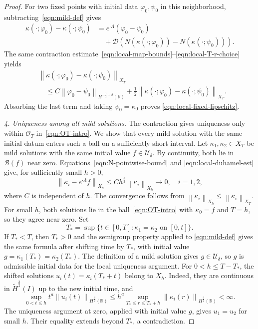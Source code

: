 \documentclass[11pt,reqno]{amsart}
\theoremstyle{plain}
\theoremstyle{definition}
\numberwithin{equation}{section}
\newcommand{\paren}[1]{\left(#1\right)}
\newcommand{\mc}[1]{\mathcal{#1}}
\newcommand{\wt}[1]{\widetilde{#1}}
\newcommand{\norm}[1]{\left\lVert #1 \right\rVert}
\newcommand{\vph}{\varphi}
\newcommand{\R}{\mathbb{R}}
\newcommand{\thi}[1]{\wt H^{#1}(I)}
\newcommand{\hr}[1]{H^{#1}(\R)}
\begin{document}
\begin{proof}
For two fixed points with initial data $\vph_0,\psi_0$ in this neighborhood,
subtracting~\eqref{eqn:mild-def} gives
\begin{equation*}
\begin{aligned}
    \kappa(\cdot;\vph_0)-\kappa(\cdot;\psi_0)
    &=e^{\cdot\Lambda}(\vph_0-\psi_0)\\
    &\quad+\mc D\paren{N(\kappa(\cdot;\vph_0))-N(\kappa(\cdot;\psi_0))}.
\end{aligned}
\end{equation*}
The same contraction estimate~\eqref{eqn:local-map-bounds}--\eqref{eqn:local-T-r-choice} yields
\begin{equation}
\begin{aligned}
    &\norm{\kappa(\cdot;\vph_0)-\kappa(\cdot;\psi_0)}_{X_T}\\
    &\quad\le C\norm{\vph_0-\psi_0}_{\hr{-\frac12+\delta}}
    +\frac12
    \norm{\kappa(\cdot;\vph_0)-\kappa(\cdot;\psi_0)}_{X_T}.
\end{aligned}
\end{equation}
Absorbing the last term and taking $\psi_0=\kappa_0$ proves
\eqref{eqn:local-fixed-lipschitz}.

\emph{4. Uniqueness among all mild solutions.}
The contraction gives uniqueness only within $\mc O_T$
in~\eqref{eqn:OT-intro}. We show that every mild solution with the same
initial datum enters such a ball on a sufficiently short interval.
Let $\kappa_1,\kappa_2\in X_T$ be mild solutions with the same initial
value $f\in\mc U_\delta$. By continuity, both lie in
$\mc B(f)$ near zero.
Equations~\eqref{eqn:N-pointwise-bound} and
\eqref{eqn:local-duhamel-est} give, for sufficiently small $h>0$,
\begin{equation}
    \norm{\kappa_i-e^{\cdot\Lambda}f}_{X_h}
    \le C h^{\frac{\varepsilon}{3}}\norm{\kappa_i}_{X_h}
    \longrightarrow0,
    \quad i=1,2,
\end{equation}
where $C$ is independent of $h$. The convergence follows from
$\norm{\kappa_i}_{X_h}\le\norm{\kappa_i}_{X_T}$. For small $h$, both
solutions lie in the ball~\eqref{eqn:OT-intro} with $\kappa_0=f$ and $T=h$, so they
agree near zero. Set
\begin{equation*}
    T_*=\sup\{t\in[0,T]:\kappa_1=\kappa_2\text{ on }[0,t]\}.
\end{equation*}
If $T_*<T$, then $T_*>0$ and the semigroup property applied to
\eqref{eqn:mild-def} gives the same formula after shifting time by $T_*$,
with initial value
$g=\kappa_1(T_*)=\kappa_2(T_*)$.
The definition of a mild solution gives $g\in\mc U_\delta$, so $g$
is admissible initial data for the local uniqueness argument.
For $0<h\le T-T_*$, the shifted
solutions $u_i(t)=\kappa_i(T_*+t)$ belong to $X_h$. Indeed, they are
continuous in $\thi{\frac32}$ up to the new initial time, and
\begin{equation*}
    \sup_{0<t\le h}t^a\norm{u_i(t)}_{\hr{\frac32}}
    \le h^a\sup_{T_*\le r\le T_*+h}\norm{\kappa_i(r)}_{\hr{\frac32}}
    <\infty.
\end{equation*}
The uniqueness argument at zero, applied with initial value $g$,
gives $u_1=u_2$ for small $h$. Their equality extends beyond
$T_*$, a contradiction.
\end{proof}
\end{document}
